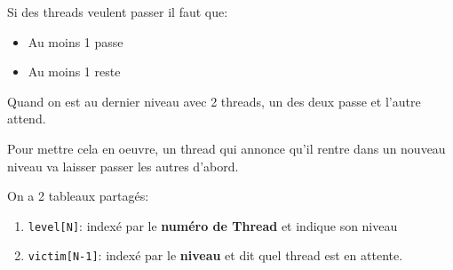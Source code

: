 Si des threads veulent passer il faut que:

\begin{itemize}
\tightlist
\item
  Au moins 1 passe
\item
  Au moins 1 reste
\end{itemize}

Quand on est au dernier niveau avec 2 threads, un des deux passe et
l'autre attend.

Pour mettre cela en oeuvre, un thread qui annonce qu'il rentre dans un
nouveau niveau va laisser passer les autres d'abord.

On a 2 tableaux partagés:

\begin{enumerate}
\def\labelenumi{\arabic{enumi}.}
\tightlist
\item
  \texttt{level{[}N{]}}: indexé par le \textbf{numéro de Thread} et
  indique son niveau
\item
  \texttt{victim{[}N-1{]}}: indexé par le \textbf{niveau} et dit quel
  thread est en attente.
\end{enumerate}

